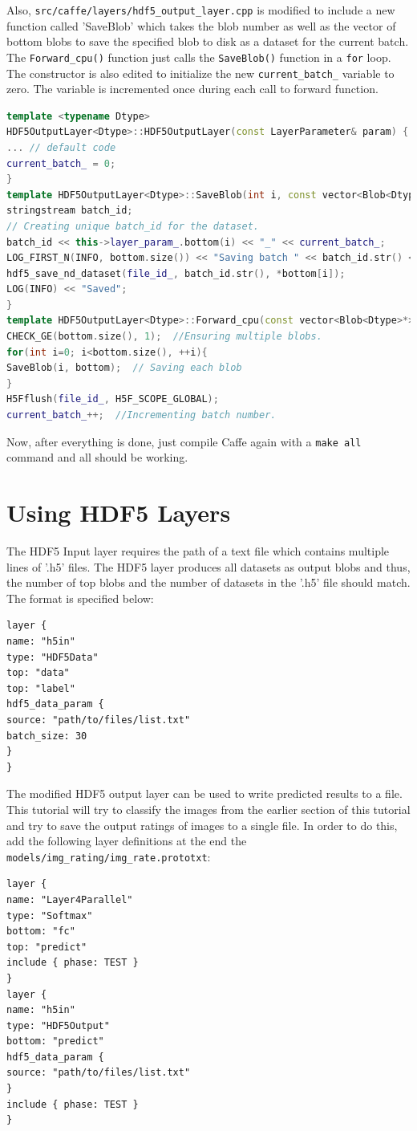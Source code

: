 \documentclass{article}
\begin{document}
Also, \verb|src/caffe/layers/hdf5_output_layer.cpp| is modified to include a new function called 'SaveBlob' which takes the blob number as well as the vector of bottom blobs to save the specified blob to disk as a dataset for the current batch. The \verb|Forward_cpu()| function just calls the \verb|SaveBlob()| function in a \texttt{for} loop. The constructor is also edited to initialize the new \verb|current_batch_| variable to zero. The variable is incremented once during each call to forward function.
\begin{lstlisting}[language=C++,breaklines]
template <typename Dtype> 
HDF5OutputLayer<Dtype>::HDF5OutputLayer(const LayerParameter& param) {
... // default code
current_batch_ = 0;
}
template HDF5OutputLayer<Dtype>::SaveBlob(int i, const vector<Blob<Dtype>*>& bottom) {
stringstream batch_id;
// Creating unique batch_id for the dataset.
batch_id << this->layer_param_.bottom(i) << "_" << current_batch_;
LOG_FIRST_N(INFO, bottom.size()) << "Saving batch " << batch_id.str() << " to file " << file_name_;
hdf5_save_nd_dataset(file_id_, batch_id.str(), *bottom[i]);
LOG(INFO) << "Saved";
}
template HDF5OutputLayer<Dtype>::Forward_cpu(const vector<Blob<Dtype>*>& bottom, const vector<Blob<Dtype>*>& top) {
CHECK_GE(bottom.size(), 1);  //Ensuring multiple blobs.
for(int i=0; i<bottom.size(), ++i){
SaveBlob(i, bottom);  // Saving each blob
}
H5Fflush(file_id_, H5F_SCOPE_GLOBAL);
current_batch_++;  //Incrementing batch number.
\end{lstlisting}

Now, after everything is done, just compile Caffe again with a \verb|make all| command and all should be working.

\section{Using HDF5 Layers}
The HDF5 Input layer requires the path of a text file which contains multiple lines of '.h5' files. The HDF5 layer produces all datasets as output blobs and thus, the number of top blobs and the number of datasets in the '.h5' file should match. The format is specified below:
\begin{lstlisting}[tabsize=2,breaklines=true]
layer {
name: "h5in"
type: "HDF5Data"
top: "data"
top: "label"
hdf5_data_param {
source: "path/to/files/list.txt"
batch_size: 30
}
}
\end{lstlisting}

The modified HDF5 output layer can be used to write predicted results to a file. This tutorial will try to classify the images from the earlier section of this tutorial and try to save the output ratings of images to a single file. In order to do this, add the following layer definitions at the end the \verb|models/img_rating/img_rate.prototxt|:
\begin{lstlisting}[tabsize=2,breaklines=true]
layer {
name: "Layer4Parallel"
type: "Softmax"
bottom: "fc"
top: "predict"
include { phase: TEST }
}
layer {
name: "h5in"
type: "HDF5Output"
bottom: "predict"
hdf5_data_param {
source: "path/to/files/list.txt"
}
include { phase: TEST }
}
\end{lstlisting}
\end{document}
